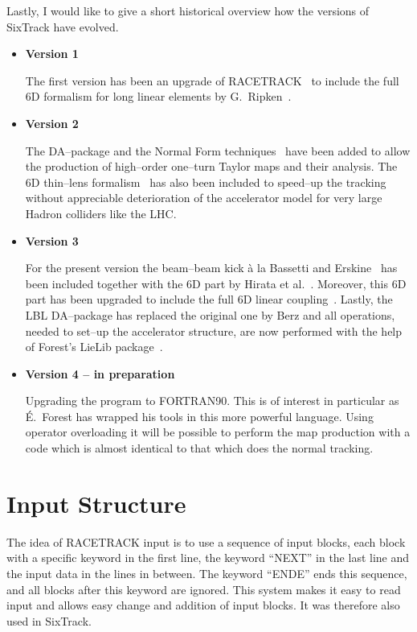 \documentclass[a4paper,11pt]{report}
\begin{document}
Lastly, I would like to give a short historical overview how the
versions of SixTrack have evolved.
\begin{itemize}
\item {\bf Version 1}

  The first version has been an upgrade of RACETRACK~\cite{RACETRACK}
  to include the full 6D formalism for long linear elements by
  G.~Ripken~\cite{Ripken85}.
\item {\bf Version 2}

  The DA--package and the Normal Form
  techniques~\cite{Berz89,Forest89} have been added to allow the
  production of high--order one--turn Taylor maps and their
  analysis. The 6D thin--lens formalism~\cite{Ripken95} has also been
  included to speed--up the tracking without appreciable deterioration
  of the accelerator model for very large Hadron colliders like the
  LHC.
\item {\bf Version 3}
  
  For the present version the beam--beam kick \`a la Bassetti and
  Erskine~\cite{BasErs} has been included together with the 6D part by
  Hirata et al.~\cite{Hirata}. Moreover, this 6D part has been
  upgraded to include the full 6D linear coupling~\cite{ripbeam}.
  Lastly, the LBL DA--package has replaced the original one by Berz
  and all operations, needed to set--up the accelerator structure, are
  now performed with the help of Forest's LieLib package~\cite{DALIE}.
\item {\bf Version 4 -- in preparation}
  
  Upgrading the program to FORTRAN90. This is of interest in
  particular as \'E.~Forest has wrapped his tools in this more
  powerful language. Using operator overloading it will be possible to
  perform the map production with a code which is almost identical to
  that which does the normal tracking.
\end{itemize}

\chapter{Input Structure} \label{InpStr}

The idea of RACETRACK input is to use a sequence of input blocks, each
block with a specific keyword in the first line, the keyword ``NEXT''
in the last line and the input data in the lines in between. The
keyword ``ENDE'' ends this sequence, and all blocks after this keyword
are ignored. This system makes it easy to read input and allows easy
change and addition of input blocks. It was therefore also used in
SixTrack\@.
\end{document}
